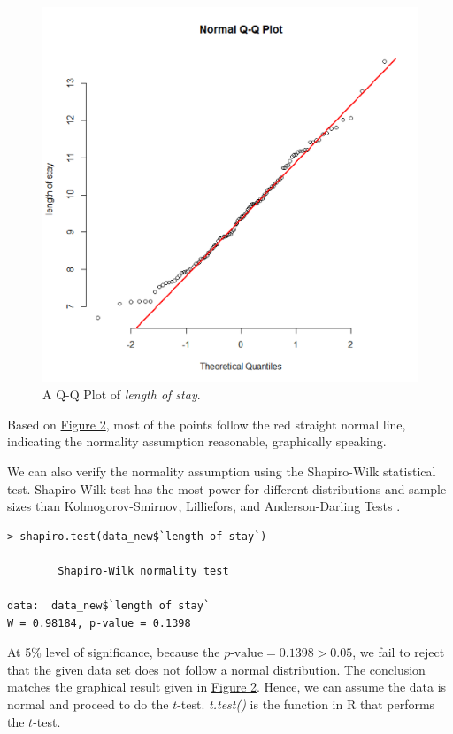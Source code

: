 \documentclass[11pt]{article}
\begin{document}
\begin{figure}[h!]\label{qqplot}
\begin{center}
\includegraphics[scale=0.5]{qq}
\end{center}\caption{A Q-Q Plot of \textit{length of stay}.}
\end{figure}

\noindent Based on \hyperref[qqplot]{Figure 2}, most of the points follow the red straight normal line, indicating the normality assumption reasonable, graphically speaking.

We can also verify the normality assumption using the Shapiro-Wilk statistical test. Shapiro-Wilk test has the most power for different distributions and sample sizes than Kolmogorov-Smirnov, Lilliefors, and Anderson-Darling Tests \cite{ar:razali_yap}.
\begin{commandline}
\begin{verbatim}
> shapiro.test(data_new$`length of stay`)

        Shapiro-Wilk normality test

data:  data_new$`length of stay`
W = 0.98184, p-value = 0.1398
\end{verbatim}
\end{commandline}
At 5\% level of significance, because the $p\textrm{-value}=0.1398>0.05$, we fail to reject that the given data set does not follow a normal distribution. The conclusion matches the graphical result given in \hyperref[qqplot]{Figure 2}. Hence, we can assume the data is normal and proceed to do the $t$-test. \textit{t.test()} is the function in R that performs the $t$-test.
\end{document}
